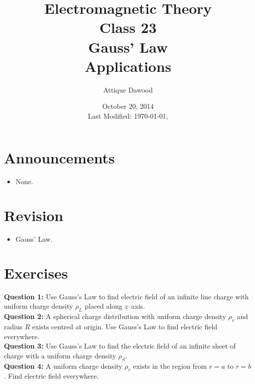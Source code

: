 \documentclass[12pt,a4paper]{article}
\title{Electromagnetic Theory\\Class 23\\Gauss' Law\\Applications}
\author{Attique Dawood}
\date{October 20, 2014\\[0.2cm] Last Modified: \today, \currenttime}
\begin{document}
\maketitle
\section{Announcements}
\begin{itemize}
\item None.
\end{itemize}
\section{Revision}
\begin{itemize}
\item Gauss' Law.
\end{itemize}
\section{Exercises}
\noindent\textbf{Question 1:} Use Gauss's Law to find electric field of an infinite line charge with uniform charge density $\rho_L$ placed along $z$--axis.\\[0.2cm]
\noindent\textbf{Question 2:} A spherical charge distribution with uniform charge density $\rho_v$ and radius $R$ exists centred at origin. Use Gauss's Law to find electric field everywhere.\\[0.2cm]
\noindent\textbf{Question 3:} Use Gauss's Law to find the electric field of an infinite sheet of charge with a uniform charge density $\rho_S$.\\[0.2cm]
\noindent\textbf{Question 4:} A uniform charge density $\rho_v$ exists in the region from $r=a$ to $r=b$. Find electric field everywhere.\\[0.2cm]
%
%
\end{document}
